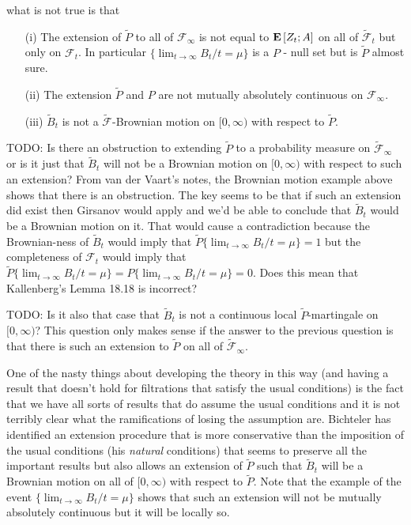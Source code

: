what is not true is that
\begin{itemize}
\item[(i)]The extension of $\tilde{P}$ to all of $\mathcal{F}_\infty$ is not equal to $\textbf{E}\left[Z_t; A\right]$ on all of $\tilde{\mathcal{F}}_t$ but only on $\mathcal{F}_t$.  In particular $\lbrace \lim_{t \to \infty} B_t/t = \mu \rbrace$ is a $P$ - null set but is $\tilde{P}$ almost sure.
\item[(ii)]The extension $\tilde{P}$ and $P$ are not mutually absolutely continuous on $\mathcal{F}_\infty$.
\item[(iii)]$\tilde{B}_t$ is not a $\tilde{\mathcal{F}}$-Brownian motion on $[0,\infty)$ with respect to $\tilde{P}$. 
\end{itemize}

TODO: Is there an obstruction to extending $\tilde{P}$ to a probability measure on $\tilde{\mathcal{F}}_\infty$ or is it just that $\tilde{B}_t$ will not be a Brownian motion on $[0,\infty)$ with respect to such an extension?  From van der Vaart's notes, the Brownian motion example above shows that there is an obstruction.  The key seems to be that if such an extension did exist then Girsanov would apply and we'd be able to conclude that $\tilde{B}_t$ would be a Brownian motion on it.  That would cause a contradiction because the Brownian-ness of $\tilde{B}_t$ would imply that $\tilde{P}\lbrace \lim_{t \to \infty} B_t/t = \mu \rbrace = 1$ but the completeness of $\mathcal{F}_t$ would imply that $\tilde{P}\lbrace \lim_{t \to \infty} B_t/t = \mu \rbrace = P\lbrace \lim_{t \to \infty} B_t/t = \mu \rbrace = 0$.  Does this mean that Kallenberg's Lemma 18.18 is incorrect?

TODO: Is it also that case that $\tilde{B}_t$ is not a continuous local $\tilde{P}$-martingale on $[0,\infty)$?  This question only makes sense if the answer to the previous question is that there is such an extension to $\tilde{P}$ on all of $\tilde{\mathcal{F}}_\infty$.

One of the nasty things about developing the theory in this way (and having a result that doesn't hold for filtrations that satisfy the usual conditions) is the fact that we have all sorts of results that do assume the usual conditions and it is not terribly clear what the ramifications of losing the assumption are.  Bichteler has identified an extension procedure that is more conservative than the imposition of the usual conditions (his \emph{natural} conditions) that seems to preserve all the important results but also allows an extension of $\tilde{P}$ such that $\tilde{B}_t$ will be a Brownian motion on all of $[0,\infty)$ with respect to $\tilde{P}$.  Note that the example of the event $\lbrace \lim_{t \to \infty} B_t/t = \mu \rbrace$ shows that such an extension will not be mutually absolutely continuous but it will be locally so.

